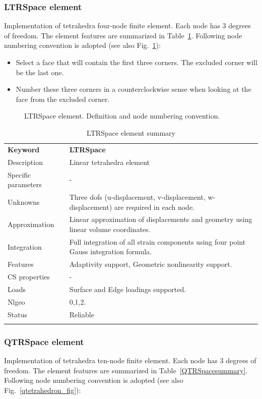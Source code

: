\documentclass[a4paper]{article}
\newcommand{\param}[1]{\texttt{#1}} %
\newcommand{\templabel}{}%
\newcommand{\tempcaption}{}%
\newcounter{nelpar}
\newenvironment{elementsummary}[5]{%
  \gdef\tempcaption{#4}%
  \gdef\templabel{#5}%
  \setcounter{nelpar}{0}%
  \begin{center} %
    \begin{table}[!htb] %
      \begin{tabular}{|l|p{9cm}|}\hline %
        {\bf Keyword} & \bf{#1}\\ %
        {Description} & {#2}\\ %
        {Specific parameters} & {#3}\\ \hline %
}{
  \\ \hline %
      \end{tabular}%
      \caption{\tempcaption}%
      \label{\templabel}%
    \end{table}%
  \end{center}%
}
\newcommand{\elementParam}[1]{%
  \ifthenelse{\value{nelpar}>0} %
             {&{#1}}%
             {\setcounter{nelpar}{1}Parameters&{#1}}%
             \\%
}
\newcommand{\elementDescription}[2]{{#1} & {#2}\\}
\begin{document}
\subsubsection{LTRSpace element}
Implementation of tetrahedra four-node finite element. 
Each node has 3 degrees of freedom. The element features are summarized in Table~\ref{LTRSpacesummary}.
Following node numbering convention is adopted (see also Fig.~\ref{lintetrahedron_fig}):
\begin{itemize}
\item Select a face that will contain the first three corners. The excluded corner will be the last one.
\item Number these three corners in a counterclockwise sense when looking at the face from the
      excluded corner.
\end{itemize}
 
\begin{figure}[htb]
 \centering
 \begin{makeimage}
  
 \end{makeimage}
 \caption{LTRSpace element. Definition and node numbering convention.}
 \label{lintetrahedron_fig}
\end{figure}

\begin{elementsummary}{LTRSpace}{Linear tetrahedra element}{-}{LTRSpace element summary}{LTRSpacesummary}
\elementDescription{Unknowns}{Three dofs (u-displacement, v-displacement, w-displacement) are required in each node.}
\elementDescription{Approximation}{ Linear approximation of displacements and geometry using linear volume coordinates.}
\elementDescription{Integration}{Full integration of all strain components using four point Gauss integration formula.}
\elementDescription{Features}{Adaptivity support, Geometric nonlinearity support.}
\elementDescription{CS properties}{-}
\elementDescription{Loads}{Surface and Edge loadings supported.}
\elementDescription{Nlgeo}{0,1,2.}
\elementDescription{Status}{Reliable}
\end{elementsummary}


\subsubsection{QTRSpace element}
Implementation of tetrahedra ten-node finite element. 
Each node has 3 degrees of freedom. The element features are summarized in Table~\ref{QTRSpacesummary}.
Following node numbering convention is adopted (see also Fig.~\ref{qtetrahedron_fig}):
\end{document}
